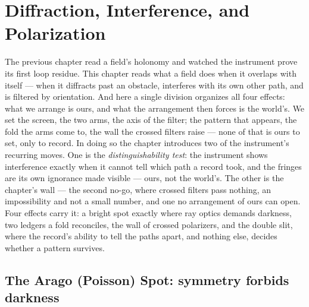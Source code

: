 \chapter{Diffraction, Interference, and Polarization}
\label{chap:diffraction-interference-polarization}

The previous chapter read a field's holonomy and watched the instrument prove its first loop residue. This
chapter reads what a field does when it overlaps with itself --- when it diffracts past an obstacle,
interferes with its own other path, and is filtered by orientation. And here a single division organizes all
four effects: what we arrange is ours, and what the arrangement then forces is the world's. We set the screen,
the two arms, the axis of the filter; the pattern that appears, the fold the arms come to, the wall the crossed
filters raise --- none of that is ours to set, only to record. In doing so the chapter introduces two of the
instrument's recurring moves. One is the \emph{distinguishability test}: the instrument shows interference
exactly when it cannot tell which path a record took, and the fringes are its own ignorance made visible ---
ours, not the world's. The other is the chapter's wall --- the second no-go, where crossed filters pass
nothing, an impossibility and not a small number, and one no arrangement of ours can open. Four effects carry
it: a bright spot exactly where ray optics demands darkness, two ledgers a fold reconciles, the wall of crossed
polarizers, and the double slit, where the record's ability to tell the paths apart, and nothing else, decides
whether a pattern survives.

\section{The Arago (Poisson) Spot: symmetry forbids darkness}
\label{se:arago}

